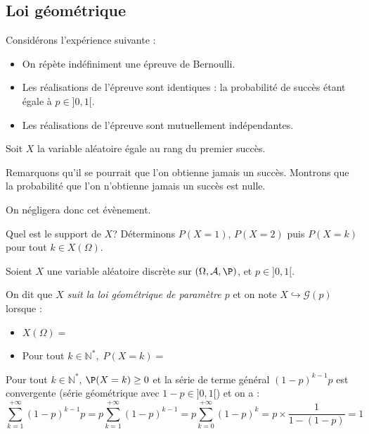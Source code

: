 \documentclass[french,11pt,twoside]{VcCours}
\begin{document}
\subsection{Loi géométrique}
Considérons l'expérience suivante : 

\begin{itemize}
  \item On répète indéfiniment une épreuve de Bernoulli.
  \item Les réalisations de l'épreuve sont identiques : la probabilité de succès étant égale à $p \in ]0,1[$.
  \item Les réalisations de l'épreuve sont mutuellement indépendantes.
 \end{itemize}
 
Soit $X$ la variable aléatoire égale au rang du premier succès. 

\vspace{0.2cm}

Remarquons qu'il se pourrait que l'on obtienne jamais un succès. Montrons que la probabilité que l'on n'obtienne jamais un succès est nulle.

\vspace{5cm}


On négligera donc cet évènement.
\vspace{0.2cm}

Quel est le support de $X$? Déterminons $P(X=1)$, $P(X=2)$ puis $P(X=k)$ pour tout $k \in X(\Omega)$.

\vspace{9cm}

\begin{Definition}{}
Soient $X$ une variable aléatoire discrète sur $(\Omega, \mathcal{A},\P)$, et $p \in ]0,1[$. 


On dit que $X$ \emph{suit la loi géométrique de paramètre $p$} et on note $X \hookrightarrow \mathcal{G}(p)$ lorsque :
\begin{itemize}
 \item $X(\Omega)= \phantom{\mathbb{N}^*.}$
 \item Pour tout $k \in \mathbb{N}^*,\;P(X=k)= \phantom{(1-p)^{k-1} p.}$
\end{itemize}
\end{Definition}

\medskip

Pour tout $k \in \mathbb{N}^*$, $\P(X=k) \geq 0$ et la série de terme général $(1-p)^{k-1} p$ est convergente (série géométrique avec $1-p \in ]0,1[$) et on a :
$$ \sum_{k=1}^{+ \infty} (1-p)^{k-1} p = p \sum_{k=1}^{+ \infty} (1-p)^{k-1} = p \sum_{k=0}^{+ \infty} (1-p)^{k} = p \times \dfrac{1}{1-(1-p)} = 1$$
\end{document}
